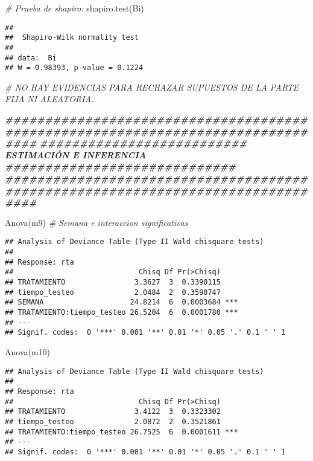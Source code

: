 \documentclass[
]{article}
\newenvironment{Shaded}{\begin{snugshade}}{\end{snugshade}}
\newcommand{\CommentTok}[1]{\textcolor[rgb]{0.56,0.35,0.01}{\textit{#1}}}
\newcommand{\DocumentationTok}[1]{\textcolor[rgb]{0.56,0.35,0.01}{\textbf{\textit{#1}}}}
\newcommand{\FunctionTok}[1]{\textcolor[rgb]{0.00,0.00,0.00}{#1}}
\newcommand{\NormalTok}[1]{#1}
\begin{document}
\begin{Shaded}
\begin{Highlighting}[]
\CommentTok{\# Prueba de shapiro:}
\FunctionTok{shapiro.test}\NormalTok{(Bi)}
\end{Highlighting}
\end{Shaded}

\begin{verbatim}
## 
##  Shapiro-Wilk normality test
## 
## data:  Bi
## W = 0.98393, p-value = 0.1224
\end{verbatim}

\begin{Shaded}
\begin{Highlighting}[]
\CommentTok{\# NO HAY EVIDENCIAS PARA RECHAZAR SUPUESTOS DE LA PARTE FIJA NI ALEATORIA.}

\DocumentationTok{\#\#\#\#\#\#\#\#\#\#\#\#\#\#\#\#\#\#\#\#\#\#\#\#\#\#\#\#\#\#\#\#\#\#\#\#\#\#\#\#\#\#\#\#\#\#\#\#\#\#\#\#\#\#\#\#\#\#\#\#\#\#\#\#\#\#\#\#\#\#\#\#\#\#\#\#\#\#\#\#}
\DocumentationTok{\#\#\#\#\#\#\#\#\#\#\#\#\#\#\#\#\#\#\#\#\#\#\#\#\#\# ESTIMACIÓN E INFERENCIA \#\#\#\#\#\#\#\#\#\#\#\#\#\#\#\#\#\#\#\#\#\#\#\#\#\#\#\#\#}
\DocumentationTok{\#\#\#\#\#\#\#\#\#\#\#\#\#\#\#\#\#\#\#\#\#\#\#\#\#\#\#\#\#\#\#\#\#\#\#\#\#\#\#\#\#\#\#\#\#\#\#\#\#\#\#\#\#\#\#\#\#\#\#\#\#\#\#\#\#\#\#\#\#\#\#\#\#\#\#\#\#\#\#\#}

\FunctionTok{Anova}\NormalTok{(m9) }\CommentTok{\# Semana e interaccion significativas}
\end{Highlighting}
\end{Shaded}

\begin{verbatim}
## Analysis of Deviance Table (Type II Wald chisquare tests)
## 
## Response: rta
##                             Chisq Df Pr(>Chisq)    
## TRATAMIENTO                3.3627  3  0.3390115    
## tiempo_testeo              2.0484  2  0.3590747    
## SEMANA                    24.8214  6  0.0003684 ***
## TRATAMIENTO:tiempo_testeo 26.5204  6  0.0001780 ***
## ---
## Signif. codes:  0 '***' 0.001 '**' 0.01 '*' 0.05 '.' 0.1 ' ' 1
\end{verbatim}

\begin{Shaded}
\begin{Highlighting}[]
\FunctionTok{Anova}\NormalTok{(m10)}
\end{Highlighting}
\end{Shaded}

\begin{verbatim}
## Analysis of Deviance Table (Type II Wald chisquare tests)
## 
## Response: rta
##                             Chisq Df Pr(>Chisq)    
## TRATAMIENTO                3.4122  3  0.3323302    
## tiempo_testeo              2.0872  2  0.3521861    
## TRATAMIENTO:tiempo_testeo 26.7525  6  0.0001611 ***
## ---
## Signif. codes:  0 '***' 0.001 '**' 0.01 '*' 0.05 '.' 0.1 ' ' 1
\end{verbatim}
\end{document}

